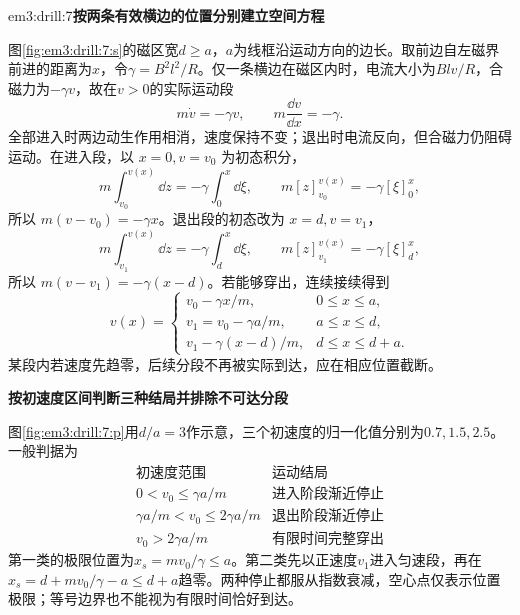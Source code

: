 \begin{drillsolution}{em3:drill:7}\textbf{按两条有效横边的位置分别建立空间方程}\par\nobreak
图\ref{fig:em3:drill:7:s}的磁区宽$d\ge a$，$a$为线框沿运动方向的边长。取前边自左磁界前进的距离为$x$，令$\gamma=B^2l^2/R$。仅一条横边在磁区内时，电流大小为$Blv/R$，合磁力为$-\gamma v$，故在$v>0$的实际运动段
\[
 m\dot v=-\gamma v,\qquad
 m\frac{\dd v}{\dd x}=-\gamma.
\]
全部进入时两边动生作用相消，速度保持不变；退出时电流反向，但合磁力仍阻碍运动。在进入段，以 $x=0,v=v_0$ 为初态积分，
\[
 m\int_{v_0}^{v(x)}\dd z=-\gamma\int_0^x\dd\xi,
 \qquad m[z]_{v_0}^{v(x)}=-\gamma[\xi]_0^x,
\]
所以 $m(v-v_0)=-\gamma x$。退出段的初态改为 $x=d,v=v_1$，
\[
 m\int_{v_1}^{v(x)}\dd z=-\gamma\int_d^x\dd\xi,
 \qquad m[z]_{v_1}^{v(x)}=-\gamma[\xi]_d^x,
\]
所以 $m(v-v_1)=-\gamma(x-d)$。若能够穿出，连续接续得到
\[
 v(x)=
 \begin{cases}
 v_0-\gamma x/m,&0\le x\le a,\\
 v_1=v_0-\gamma a/m,&a\le x\le d,\\
 v_1-\gamma(x-d)/m,&d\le x\le d+a.
 \end{cases}
\]
某段内若速度先趋零，后续分段不再被实际到达，应在相应位置截断。



\par\medskip{}\noindent\textbf{按初速度区间判断三种结局并排除不可达分段}\par\nobreak
{}

图\ref{fig:em3:drill:7:p}用$d/a=3$作示意，三个初速度的归一化值分别为$0.7,1.5,2.5$。一般判据为
\[
 \begin{array}{c|c}
 \text{初速度范围}&\text{运动结局}\\ \hline
 0<v_0\le\gamma a/m&\text{进入阶段渐近停止}\\
 \gamma a/m<v_0\le2\gamma a/m&\text{退出阶段渐近停止}\\
 v_0>2\gamma a/m&\text{有限时间完整穿出}
 \end{array}
\]
第一类的极限位置为$x_s=mv_0/\gamma\le a$。第二类先以正速度$v_1$进入匀速段，再在$x_s=d+mv_0/\gamma-a\le d+a$趋零。两种停止都服从指数衰减，空心点仅表示位置极限；等号边界也不能视为有限时间恰好到达。




\end{drillsolution}

